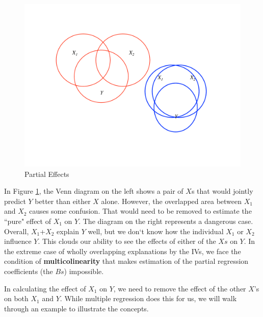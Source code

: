 \documentclass[11pt,openany]{book}\usepackage[]{graphicx}\usepackage[]{color}
\begin{document}
{\begin{figure}
  \centering
  \includegraphics[width=5in]{12_LogicMult/partef.pdf}
  \caption{Partial Effects \label{fig:partef}}
\end{figure}

In Figure \ref{fig:partef}, the Venn diagram on the left shows a pair of $X$s that would jointly predict $Y$ better than either $X$ alone. However,
the overlapped area between $X_{1}$ and $X_{2}$ causes some confusion. That would need to be removed to estimate the ``pure" effect of $X_{1}$ on $Y$. The diagram on the right represents a dangerous case. Overall, $X_{1}$+$X_2$ explain $Y$ well, but we don`t know how the individual $X_1$ or $X_2$ influence $Y$.  This clouds our ability to see the effects of either of the $Xs$ on $Y$. In the extreme case of wholly overlapping explanations by the IVs, we face the condition of \textbf{multicolinearity} that makes estimation of the partial regression coefficients (the $Bs$) impossible.
     
In calculating the effect of $X_1$ on $Y$, we need to remove the effect of the other $X$’s on both $X_1$ and $Y$.  While multiple regression does this for us, we will walk through an example to illustrate the concepts. 

\begin{grbox}
\end{grbox}}
\end{document}
